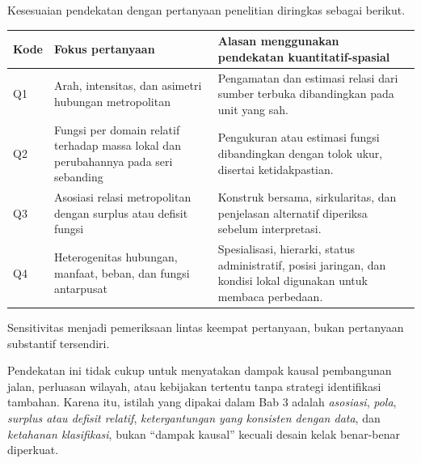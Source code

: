 \documentclass[11pt,a4paper,oneside,openany,indonesian]{report}
\begin{document}
Kesesuaian pendekatan dengan pertanyaan penelitian diringkas sebagai
berikut.

{\def\LTcaptype{none} %
\begin{longtable}[]{@{}
  >{\raggedright\arraybackslash}p{}
  >{\raggedright\arraybackslash}p{}
  >{\raggedright\arraybackslash}p{}@{}}
\toprule\noalign{}
\begin{minipage}[b]{\linewidth}\raggedright
Kode
\end{minipage} & \begin{minipage}[b]{\linewidth}\raggedright
Fokus pertanyaan
\end{minipage} & \begin{minipage}[b]{\linewidth}\raggedright
Alasan menggunakan pendekatan kuantitatif-spasial
\end{minipage} \\
\midrule\noalign{}
\endhead
\bottomrule\noalign{}
\endlastfoot
Q1 & Arah, intensitas, dan asimetri hubungan metropolitan & Pengamatan
dan estimasi relasi dari sumber terbuka dibandingkan pada unit yang
sah. \\
Q2 & Fungsi per domain relatif terhadap massa lokal dan perubahannya
pada seri sebanding & Pengukuran atau estimasi fungsi dibandingkan
dengan tolok ukur, disertai ketidakpastian. \\
Q3 & Asosiasi relasi metropolitan dengan surplus atau defisit fungsi &
Konstruk bersama, sirkularitas, dan penjelasan alternatif diperiksa
sebelum interpretasi. \\
Q4 & Heterogenitas hubungan, manfaat, beban, dan fungsi antarpusat &
Spesialisasi, hierarki, status administratif, posisi jaringan, dan
kondisi lokal digunakan untuk membaca perbedaan. \\
\end{longtable}
}

Sensitivitas menjadi pemeriksaan lintas keempat pertanyaan, bukan
pertanyaan substantif tersendiri.

Pendekatan ini tidak cukup untuk menyatakan dampak kausal pembangunan
jalan, perluasan wilayah, atau kebijakan tertentu tanpa strategi
identifikasi tambahan. Karena itu, istilah yang dipakai dalam Bab 3
adalah \emph{asosiasi}, \emph{pola}, \emph{surplus atau defisit
relatif}, \emph{ketergantungan yang konsisten dengan data}, dan
\emph{ketahanan klasifikasi}, bukan ``dampak kausal'' kecuali desain
kelak benar-benar diperkuat.
\end{document}

